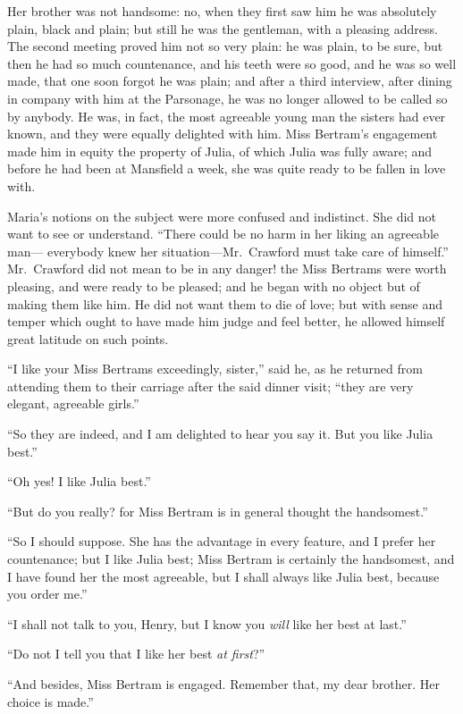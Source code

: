 \documentclass{article}
\begin{document}
Her brother was not handsome:  no, when they first saw him
he was absolutely plain, black and plain; but still he
was the gentleman, with a pleasing address.  The second
meeting proved him not so very plain:  he was plain,
to be sure, but then he had so much countenance, and his
teeth were so good, and he was so well made, that one
soon forgot he was plain; and after a third interview,
after dining in company with him at the Parsonage,
he was no longer allowed to be called so by anybody.
He was, in fact, the most agreeable young man the sisters
had ever known, and they were equally delighted with him.
Miss Bertram's engagement made him in equity the property
of Julia, of which Julia was fully aware; and before he had
been at Mansfield a week, she was quite ready to be fallen
in love with.

Maria's notions on the subject were more confused
and indistinct.  She did not want to see or understand.
``There could be no harm in her liking an agreeable man---%
everybody knew her situation---Mr.\ Crawford must take care
of himself.''  Mr.\ Crawford did not mean to be in any danger!
the Miss Bertrams were worth pleasing, and were ready
to be pleased; and he began with no object but of making
them like him.  He did not want them to die of love;
but with sense and temper which ought to have made him
judge and feel better, he allowed himself great latitude
on such points.

``I like your Miss Bertrams exceedingly, sister,'' said he,
as he returned from attending them to their carriage
after the said dinner visit; ``they are very elegant,
agreeable girls.''

``So they are indeed, and I am delighted to hear you say it.
But you like Julia best.''

``Oh yes!  I like Julia best.''

``But do you really? for Miss Bertram is in general thought
the handsomest.''

``So I should suppose.  She has the advantage in every feature,
and I prefer her countenance; but I like Julia best;
Miss Bertram is certainly the handsomest, and I have found
her the most agreeable, but I shall always like Julia best,
because you order me.''

``I shall not talk to you, Henry, but I know you \emph{will}
like her best at last.''

``Do not I tell you that I like her best \emph{at first}?''

``And besides, Miss Bertram is engaged.  Remember that,
my dear brother.  Her choice is made.''
\end{document}
